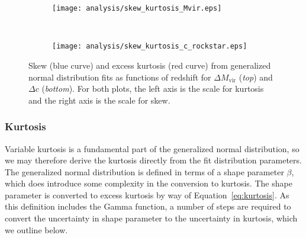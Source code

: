 \begin{figure*}[t]
	\centering
	\begin{subfigure}{}
		\texttt{[image: analysis/skew\_kurtosis\_Mvir.eps]}
	\end{subfigure}
	\\
	\begin{subfigure}{}
		\texttt{[image: analysis/skew\_kurtosis\_c\_rockstar.eps]}
	\end{subfigure}
	\caption[Skew and kurtosis as functions of redshift for generalized normal fits]{\footnotesize Skew (blue curve) and excess kurtosis (red curve) from generalized normal distribution fits as functions of redshift for $\Delta M_{\mathrm{vir}}$ (\textit{top}) and $\Delta c$ (\textit{bottom}).  For both plots, the left axis is the scale for kurtosis and the right axis is the scale for skew.}
	\label{fig:methods--analysis--fit_trends_skew_kurtosis}
\end{figure*}



\subsubsection{Kurtosis}
\label{subsubsec:analysis--redshift_trends--kurtosis}


Variable kurtosis is a fundamental part of the generalized normal distribution, so we may therefore derive the kurtosis directly from the fit distribution parameters.  The generalized normal distribution is defined in terms of a shape parameter $\beta$, which does introduce some complexity in the conversion to kurtosis.  The shape parameter is converted to excess kurtosis by way of Equation~\ref{eq:kurtosis}.  As this definition includes the Gamma function, a number of steps are required to convert the uncertainty in shape parameter to the uncertainty in kurtosis, which we outline below.


